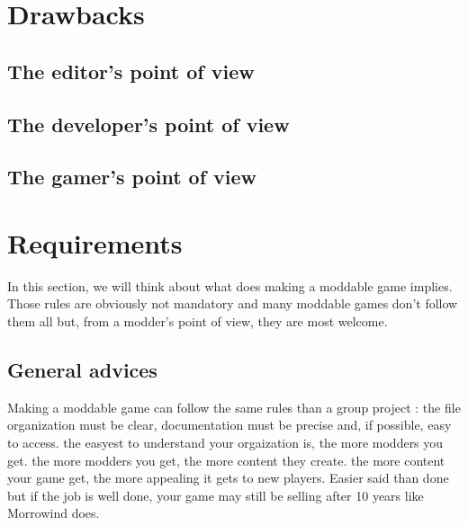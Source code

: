 \documentclass[a4paper,11pt]{article}
\begin{document}
\section{Drawbacks }

\subsection{The editor's point of view}

\subsection{The developer's point of view}

\subsection{The gamer's point of view}


\section{Requirements}

In this section, we will think about what does making a moddable game implies. Those rules are obviously not mandatory and many moddable games don’t follow them all but, from a modder’s point of view, they are most welcome.

\subsection{General advices}
Making a moddable game can follow the same rules than a group project : the file organization must be clear, documentation must be precise and, if possible, easy to access. 
the easyest to understand your orgaization is, the more modders you get. the more modders you get, the more content they create. the more content your game get, the more appealing it gets to new players. Easier said than done but if the job is well done, your game may still be selling after 10 years like Morrowind does.
\end{document}
